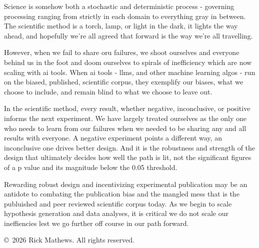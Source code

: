 \documentclass[12pt]{article}
\begin{document}
Science is somehow both a stochastic and deterministic process - governing processing ranging from strictly in each domain to everything gray in between. The scientific method is a torch, lamp, or light in the dark, it lights the way ahead, and hopefully we're all agreed that forward is the way we're all travelling.

However, when we fail to share oru failures, we shoot ourselves and everyone behind us in the foot and doom ourselves to spirals of inefficiency which are now scaling with ai tools. When ai tools - llms, and other machine learning algos - run on the biased, published, scientific corpus, they exemplify our biases, what we choose to include, and remain blind to what we choose to leave out.

In the scientific method, every result, whether negative, inconclusive, or positive informs the next experiment. We have largely treated ourselves as the only one who needs to learn from our failures when we needed to be sharing any and all results with everyone. A negative experiment points a different way, an inconclusive one drives better design. And it is the robustness and strength of the design that ultimately decides how well the path is lit, not the significant figures of a p value and its magnitude below the 0.05 threshold.

Rewarding robust design and incentivizing experimental publication may be an antidote to combating the publication bias and the mangled mess that is the publuished and peer reviewed scientific corpus today. As we begin to scale hypothesis generation and data analyses, it is critical we do not scale our ineffiencies lest we go further off course in our path forward.


\vspace{10pt}
{\centering\footnotesize \copyright\ 2026 Rick Mathews. All rights reserved.\par}
\end{document}
